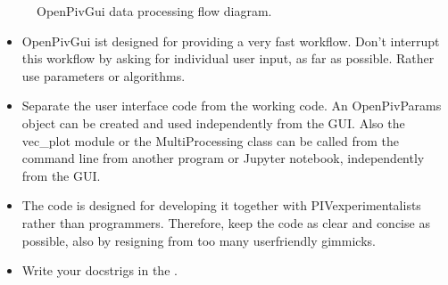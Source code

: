 \documentclass[letterpaper,10pt,english]{sphinxmanual}
\begin{document}
\begin{figure}[htbp]
\centering
\capstart

\noindent{}
\caption{OpenPivGui data processing flow diagram.}\label{\detokenize{contribution:id2}}\end{figure}
\begin{itemize}
\item {} 
OpenPivGui ist designed for providing a very fast workflow. Don’t interrupt this workflow by asking for individual user input, as far as possible. Rather use parameters or algorithms.

\item {} 
Separate the user interface code from the working code. An OpenPivParams object can be created and used independently from the GUI. Also the vec\_plot module or the MultiProcessing class can be called from the command line from another program or Jupyter notebook, independently from the GUI.

\item {} 
The code is designed for developing it together with PIV\sphinxhyphen{}experimentalists rather than programmers. Therefore, keep the code as clear and concise as possible, also by resigning from too many user\sphinxhyphen{}friendly gimmicks.

\item {} 
Write your docstrigs in the .

\end{itemize}
\end{document}
